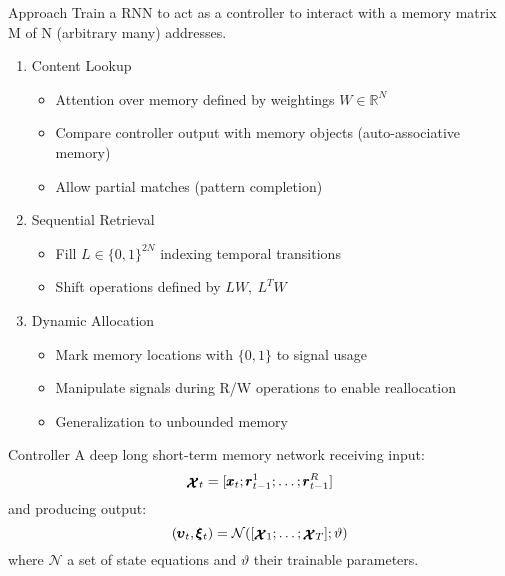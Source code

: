 \documentclass{beamer}
\newcommand{\xx}{\pmb{\raisebox{-1.5pt}{$\mathcal{X}$}}}
\begin{document}
\begin{frame}{Approach}
	Train a RNN to act as a \alert{controller} to interact with a memory matrix M of N (arbitrary many) addresses.
	\pause
	\begin{enumerate}
	\item \alert{Content Lookup}\\
		\begin{itemize}
		\item \alert{Attention} over memory defined by weightings $W \in \mathbb{R}^N$
		\item Compare controller output with memory objects (\alert{auto-associative memory})
		\item Allow partial matches  (\alert{pattern completion})
		\end{itemize}
	\pause
	\item \alert{Sequential Retrieval}
		\begin{itemize} 
		\item Fill $L \in \{0,1\}^{2N}$ indexing \alert{temporal transitions}
		\item \alert{Shift} operations defined by $LW,\ L^TW$
		\end{itemize}
	\pause
	\item \alert{Dynamic Allocation}
		\begin{itemize}
		\item Mark memory locations with $\{0,1\}$ to \alert{signal usage}
		\item Manipulate signals during R/W operations to enable \alert{reallocation}
		\item Generalization to \alert{unbounded memory}
		\end{itemize}
	\end{enumerate}
\end{frame}
	
\begin{frame}{Controller}
	A deep \alert{long short-term memory network} receiving input:
	\[
	\xx_t=[ \pmb{x}_t; \pmb{r}_{t-1}^1; \dots ;\pmb{r}_{t-1}^R]
	\]
	and producing output:
	\[
	(\pmb{\upsilon}_t,\pmb{\xi}_t)=\mathcal{N}([\xx_1;\dots;\xx_T];\vartheta)
	\]
	where $\mathcal{N}$ a set of state equations and $\vartheta$ their trainable parameters.
\end{frame}
\end{document}
